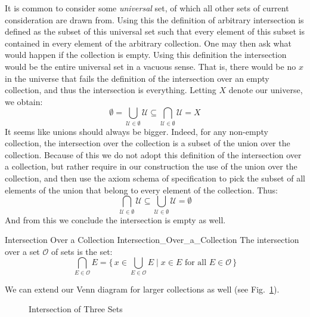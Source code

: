         It is common to consider some \textit{universal} set, of which all
        other sets of current consideration are drawn from. Using this the
        definition of arbitrary intersection is defined as the subset of
        this universal set such that every element of this subset is
        contained in every element of the arbitrary collection. One may then
        ask what would happen if the collection is empty. Using this
        definition the intersection would be the entire universal set
        in a vacuous sense. That is, there would be no $x$ in the universe
        that fails the definition of the intersection over an empty
        collection, and thus the intersection is everything. Letting $X$
        denote our universe, we obtain:
        \begin{equation}
            \emptyset
            =\bigcup_{\mathcal{U}\in\emptyset}\mathcal{U}
            \subseteq\bigcap_{\mathcal{U}\in\emptyset}\mathcal{U}
            =X
        \end{equation}
        It seems like unions should always be bigger. Indeed, for any
        non-empty collection, the intersection over the collection is a
        subset of the union over the collection. Because of this we do
        not adopt this definition of the intersection over a collection,
        but rather require in our construction the use of the union over
        the collection, and then use the axiom schema of specification to
        pick the subset of all elements of the union that belong to every
        element of the collection. Thus:
        \begin{equation}
            \bigcap_{\mathcal{U}\in\emptyset}\mathcal{U}
            \subseteq\bigcup_{\mathcal{U}\in\emptyset}\mathcal{U}
            =\emptyset
        \end{equation}
        And from this we conclude the intersection is empty as well.
        \begin{fdefinition}{Intersection Over a Collection}
                           {Intersection_Over_a_Collection}
            The \gls{intersection over a set} $\mathcal{O}$
            of sets is the set:
            \begin{equation*}
                \bigcap_{E\in\mathcal{O}}E
                =\Big\{\,x\in\bigcup_{E\in\mathcal{O}}E\;\Big|\;x\in{E}
                    \textrm{ for all }E\in\mathcal{O}\,\Big\}
            \end{equation*}
        \end{fdefinition}
        We can extend our Venn diagram for larger collections as well
        (see Fig.~\ref{fig:Intersection_of_Three_Sets}).
        \begin{figure}[H]
            \centering
            
            \caption{Intersection of Three Sets}
            \label{fig:Intersection_of_Three_Sets}
        \end{figure}
